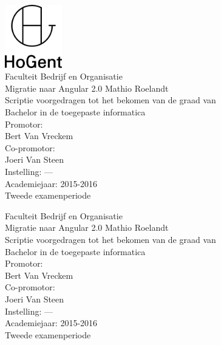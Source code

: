 \documentclass[pdftex,a4paper,12pt,twoside]{report}
\newcommand{\emptypage}{
\newpage
\thispagestyle{empty}
\mbox{}
\newpage
}
\newcommand{\student}{Mathio Roelandt}
\newcommand{\promotor}{Bert Van Vreckem}
\newcommand{\copromotor}{Joeri Van Steen}
\newcommand{\instelling}{---}
\newcommand{\titel}{Migratie naar Angular 2.0}
\newcommand{\faculteit}{Faculteit Bedrijf en Organisatie}
\newcommand{\rapporttype}{Scriptie voorgedragen tot het bekomen van de graad van\\Bachelor in de toegepaste informatica}
\newcommand{\academiejaar}{2015-2016}
\newcommand{\examenperiode}{Tweede examenperiode}
\begin{document}

\begin{titlepage}
  \begin{center}

    \begingroup
    \rmfamily
    \includegraphics[width=2.5cm]{img/HG-beeldmerk-woordmerk}\\[.5cm]
    \faculteit\\[3cm]
    \titel
    \vfill
    \student\\[3.5cm]
    \rapporttype\\[2cm]
    Promotor:\\
    \promotor\\
    Co-promotor:\\
    \copromotor\\[2.5cm]
    Instelling: \instelling\\[.5cm]
    Academiejaar: \academiejaar\\[.5cm]
    \examenperiode
    \endgroup

  \end{center}
  \restoregeometry
\end{titlepage}


\emptypage


\begin{titlepage}
  \begin{center}

    \begingroup
    \rmfamily
    \faculteit\\[3cm]
    \titel
    \vfill
    \student\\[3.5cm]
    \rapporttype\\[2cm]
    Promotor:\\
    \promotor\\
    Co-promotor:\\
    \copromotor\\[2.5cm]
    Instelling: \instelling\\[.5cm]
    Academiejaar: \academiejaar\\[.5cm]
    \examenperiode
    \endgroup

  \end{center}
  \restoregeometry
\end{titlepage}
\end{document}
